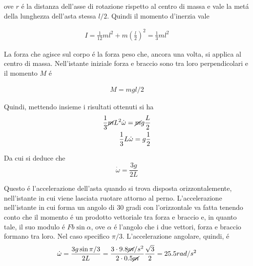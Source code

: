 \documentclass[17pt]{extarticle}
\begin{document}
ove $r$ \'e la distanza dell'asse di rotazione rispetto al centro di massa e vale la met\'a della lunghezza dell'asta stessa $l/2$. Quindi il momento d'inerzia vale

\begin{eqnarray}
	I = \frac{1}{12}ml^2 + m\left(\frac{l}{2}\right)^2 = \frac{1}{3}ml^2
\end{eqnarray}


La forza che agisce sul corpo \'e la forza peso che, ancora una volta, si applica al centro di massa. Nell'istante iniziale forza e braccio sono tra loro perpendicolari e il momento $M$ \'e

\begin{eqnarray}\label{eq:momento}
	M = mgl/2
\end{eqnarray}

Quindi, mettendo insieme i risultati ottenuti si ha
\begin{eqnarray}\nonumber
	\frac{1}{3}\cancel{m}L^2\dot{\omega} = \cancel{m}g\frac{L}{2}\\
	\frac{1}{3}L\dot{\omega} = g\frac{1}{2}
\end{eqnarray}

Da cui si deduce che 
\begin{equation}
	\dot{\omega} = \frac{3g}{2L}
\end{equation}

Questo \'e l'accelerazione dell'asta quando si trova disposta orizzontalemente, nell'istante in cui viene lasciata ruotare attorno al perno. L'accelerazione nell'istante in cui forma un angolo di 30 gradi con l'orizzontale va fatta tenendo conto che il momento \'e un prodotto vettoriale tra forza e braccio e, in quanto tale, il suo modulo \'e $Fb\sin{\alpha}$, ove $\alpha$ \'e l'angolo che i due vettori, forza e braccio formano tra loro. Nel caso specifico $\pi/3$. L'accelerazione angolare, quindi, \'e
\begin{eqnarray}
	\dot{\omega} = \frac{3g\sin{\pi/3} }{2L} = \frac{3\cdot 9.8 \cancel{m}/s^2}{2\cdot 0.5 \cancel{m}}\frac{\sqrt{3}}{2} = 25.5rad/s^2
\end{eqnarray}
\end{document}
